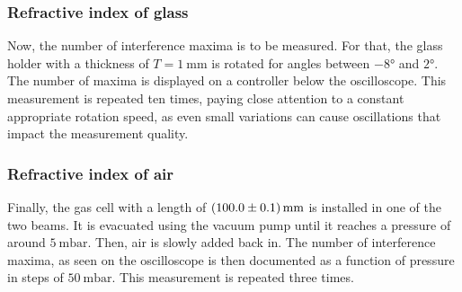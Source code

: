 \subsubsection{Refractive index of glass}
\label{subsec:DruchführungGlass}
Now, the number of interference maxima is to be measured.
For that, the glass holder with a thickness of $T = \SI{1}{\milli\meter}$ is rotated for angles between $-8°$ and $2°$.
The number of maxima is displayed on a controller below the oscilloscope.
This measurement is repeated ten times, paying close attention to a constant appropriate rotation speed, as even small variations can cause oscillations that impact the measurement quality. \\

\subsubsection{Refractive index of air}
\label{subsec:DurchführungLuft}
Finally, the gas cell with a length of $\SI{100.0 \pm 0.1}{\milli\meter}$ is installed in one of the two beams.
It is evacuated using the vacuum pump until it reaches a pressure of around $\SI{5}{\milli\bar}$.
Then, air is slowly added back in.
The number of interference maxima, as seen on the oscilloscope is then documented as a function of pressure in steps of $\SI{50}{\milli\bar}$.
This measurement is repeated three times.

